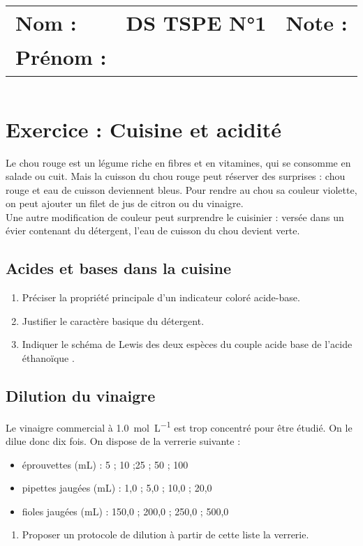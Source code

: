 \documentclass[a4paper,11pt,fleqn]{article}%
\title{\vspace{-1cm}\large 
	\begin{tabular}{|m{5cm}|>{\centering}m{8cm}|>{\centering\arraybackslash}m{4cm}|}
		\hline
		Nom : & \textbf{\textsc{DS TSPE N°1}} &  Note : \\
		Prénom : & & \\\hline
\end{tabular}}
\date{}
\begin{document}
\maketitle
\vspace{-2.5cm}

\section*{Exercice : Cuisine et acidité}
Le chou rouge est un légume riche en fibres et en vitamines, qui se consomme en salade ou cuit. Mais la cuisson du chou rouge peut réserver des surprises : chou rouge et eau de cuisson deviennent bleus. Pour rendre au chou sa couleur violette, on peut ajouter un filet de jus de citron ou du vinaigre.\\
Une autre modification de couleur peut surprendre le cuisinier : versée dans un évier contenant du détergent, l'eau de cuisson du chou devient verte.
	\subsection{Acides et bases dans la cuisine}
	\begin{enumerate}
		\item Préciser la propriété principale d'un indicateur coloré acide-base.
		\item Justifier le caractère basique du détergent.
		\item Indiquer le schéma de Lewis des deux espèces du couple acide base de l'acide éthanoïque .
	\end{enumerate}
	
	\subsection{Dilution du vinaigre}
	Le vinaigre commercial à \SI{1.0}{\mole\per\liter} est trop concentré pour être étudié. On le dilue donc dix fois. On dispose de la verrerie suivante :
	\begin{itemize}
		\item éprouvettes (mL) : 5 ; 10 ;25 ; 50 ; 100
		\item pipettes jaugées (mL) : 1,0 ; 5,0 ; 10,0 ; 20,0
		\item fioles jaugées (mL) : 150,0 ; 200,0 ; 250,0 ; 500,0 
	\end{itemize}
	\begin{enumerate}[resume]
		\item Proposer un protocole de dilution à partir de cette liste la verrerie.
	\end{enumerate}
	
\end{document}
